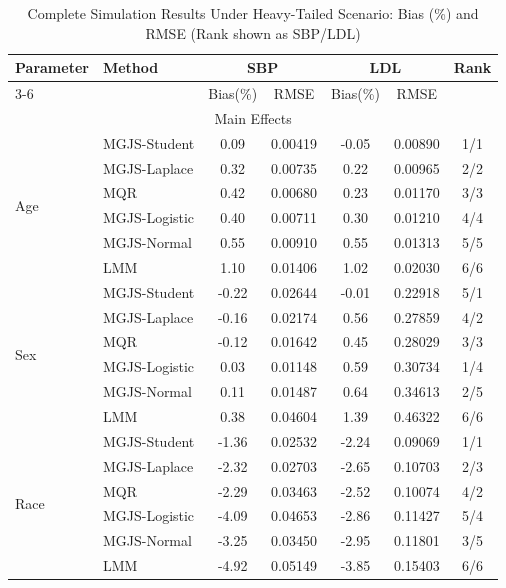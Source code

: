 \documentclass[twoside]{article}
\begin{document}
\begin{table}
	\centering
	\caption{Complete Simulation Results Under Heavy-Tailed Scenario: Bias (\%) and RMSE (Rank shown as SBP/LDL)}
	\label{tab:simulation_results_complete}
	\setlength{\tabcolsep}{2.5pt}
	\renewcommand{\arraystretch}{0.65}
	\footnotesize
	\begin{tabular}{l l c c c c c}
		\hline
		\multirow{2}{*}{Parameter} & \multirow{2}{*}{Method} & \multicolumn{2}{c}{SBP} & \multicolumn{2}{c}{LDL} & \multirow{2}{*}{Rank} \\
		\cline{3-6}
		& & Bias(\%) & RMSE & Bias(\%) & RMSE & \\
		\hline
		\multicolumn{7}{c}{Main Effects} \\
		\hline
		\multirow{6}{*}{Age} & MGJS-Student & 0.09 & 0.00419 & -0.05 & 0.00890 & 1/1 \\
		& MGJS-Laplace & 0.32 & 0.00735 & 0.22 & 0.00965 & 2/2 \\
		& MQR & 0.42 & 0.00680 & 0.23 & 0.01170 & 3/3 \\
		& MGJS-Logistic & 0.40 & 0.00711 & 0.30 & 0.01210 & 4/4 \\
		& MGJS-Normal & 0.55 & 0.00910 & 0.55 & 0.01313 & 5/5 \\
		& LMM & 1.10 & 0.01406 & 1.02 & 0.02030 & 6/6 \\
		\hline
		\multirow{6}{*}{Sex} & MGJS-Student & -0.22 & 0.02644 & -0.01 & 0.22918 & 5/1 \\
		& MGJS-Laplace & -0.16 & 0.02174 & 0.56 & 0.27859 & 4/2 \\
		& MQR & -0.12 & 0.01642 & 0.45 & 0.28029 & 3/3 \\
		& MGJS-Logistic & 0.03 & 0.01148 & 0.59 & 0.30734 & 1/4 \\
		& MGJS-Normal & 0.11 & 0.01487 & 0.64 & 0.34613 & 2/5 \\
		& LMM & 0.38 & 0.04604 & 1.39 & 0.46322 & 6/6 \\
		\hline
		\multirow{6}{*}{Race} & MGJS-Student & -1.36 & 0.02532 & -2.24 & 0.09069 & 1/1 \\
		& MGJS-Laplace & -2.32 & 0.02703 & -2.65 & 0.10703 & 2/3 \\
		& MQR & -2.29 & 0.03463 & -2.52 & 0.10074 & 4/2 \\
		& MGJS-Logistic & -4.09 & 0.04653 & -2.86 & 0.11427 & 5/4 \\
		& MGJS-Normal & -3.25 & 0.03450 & -2.95 & 0.11801 & 3/5 \\
		& LMM & -4.92 & 0.05149 & -3.85 & 0.15403 & 6/6 \\
		\hline

\end{tabular}
\end{table}
\end{document}
